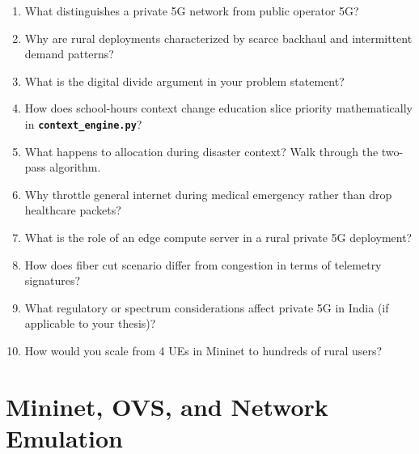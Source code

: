 \documentclass[11pt,a4paper]{article}
\newcommand{\proj}[1]{\textbf{\texttt{#1}}}
\begin{document}
\begin{enumerate}
    \item What distinguishes a private 5G network from public operator 5G?
    \item Why are rural deployments characterized by scarce backhaul and intermittent demand patterns?
    \item What is the digital divide argument in your problem statement?
    \item How does school-hours context change education slice priority mathematically in \proj{context\_engine.py}?
    \item What happens to allocation during disaster context? Walk through the two-pass algorithm.
    \item Why throttle general internet during medical emergency rather than drop healthcare packets?
    \item What is the role of an edge compute server in a rural private 5G deployment?
    \item How does fiber cut scenario differ from congestion in terms of telemetry signatures?
    \item What regulatory or spectrum considerations affect private 5G in India (if applicable to your thesis)?
    \item How would you scale from 4 UEs in Mininet to hundreds of rural users?
\end{enumerate}

\section{Mininet, OVS, and Network Emulation}
\end{document}
